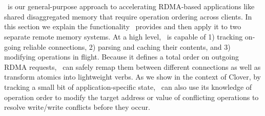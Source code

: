 


\section{\sword}

\sword\ is our general-purpose approach to accelerating RDMA-based
applications like shared disaggregated memory that require operation
ordering across clients.  In this section we explain the functionality
\sword\ provides and then apply it to two separate remote memory
systems.  At a high level, \sword\ is capable of 1) tracking on-going
reliable connections, 2) parsing and caching their contents, and 3)
modifying operations in flight.  Because it defines a total order on
outgoing RDMA requests, \sword\ can safely remap them between
different connections as well as transform atomics into lightweight
verbs.  As we show in the context of Clover, by tracking a small bit
of application-specific state, \sword\ can also use its knowledge of
operation order to modify the target address or value of conflicting
operations to resolve write/write conflicts before they occur.





